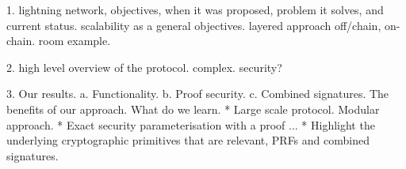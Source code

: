 
1. lightning network, objectives, when it was proposed, problem it solves, and current status. scalability as a general objectives. layered approach off/chain, on-chain. room example. 

2. high level overview of the protocol. complex. security? 

3. Our results. 
a. Functionality. 
b. Proof security. 
c. Combined signatures. 
The benefits of our approach.
What do we learn. 
 * Large scale protocol. Modular approach.
 * Exact security parameterisation with a proof ... 
 * Highlight the underlying cryptographic primitives that are relevant, 
 PRFs  and combined signatures.